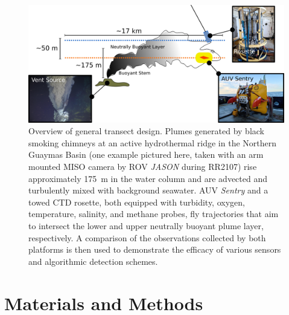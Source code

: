 \begin{figure}[h!]
    \centering
    \includegraphics[width=\columnwidth]{figures/chap3_schematic.jpg}
    \caption[Overview of transect design for hydrothermal discovery]{Overview of general transect design. Plumes generated by black smoking chimneys at an active hydrothermal ridge in the Northern Guaymas Basin (one example pictured here, taken with an arm mounted MISO camera by ROV \emph{JASON} during RR2107) rise approximately \SI{175}{\meter} in the water column and are advected and turbulently mixed with background seawater. AUV \emph{Sentry} and a towed CTD rosette, both equipped with turbidity, oxygen, temperature, salinity, and methane probes, fly trajectories that aim to intersect the lower and upper neutrally buoyant plume layer, respectively. A comparison of the observations collected by both platforms is then used to demonstrate the efficacy of various sensors and algorithmic detection schemes.}
    \label{fig:schematic}
\end{figure}

\section{Materials and Methods}

